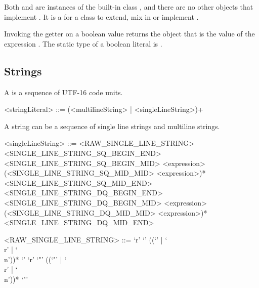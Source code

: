 \documentclass[makeidx]{article}
\begin{document}
{\LMHash{}%
Both  and  are instances of
the built-in class ,
and there are no other objects that implement .
It is a  for a class to
extend, mix in or implement .


\LMHash{}%
Invoking the getter  on a boolean value returns
the  object that is the value of the expression .
The static type of a boolean literal is .


\subsection{Strings}

\LMHash{}%
A  is a sequence of UTF-16 code units.


\begin{grammar}
<stringLiteral> ::= (<multilineString> | <singleLineString>)+
\end{grammar}

\LMHash{}%
A string can be a sequence of single line strings and multiline strings.

\begin{grammar}
<singleLineString> ::= <RAW\_SINGLE\_LINE\_STRING>
  \alt <SINGLE\_LINE\_STRING\_SQ\_BEGIN\_END>
  \alt <SINGLE\_LINE\_STRING\_SQ\_BEGIN\_MID> <expression> \gnewline{}
       (<SINGLE\_LINE\_STRING\_SQ\_MID\_MID> <expression>)* \gnewline{}
       <SINGLE\_LINE\_STRING\_SQ\_MID\_END>
  \alt <SINGLE\_LINE\_STRING\_DQ\_BEGIN\_END>
  \alt <SINGLE\_LINE\_STRING\_DQ\_BEGIN\_MID> <expression> \gnewline{}
       (<SINGLE\_LINE\_STRING\_DQ\_MID\_MID> <expression>)* \gnewline{}
       <SINGLE\_LINE\_STRING\_DQ\_MID\_END>

<RAW\_SINGLE\_LINE\_STRING> ::=
  `r' `\sq' (\gtilde(`\sq' | `\\r' | `\\n'))* `\sq'
  \alt `r' `"' (\gtilde(`"' | `\\r' | `\\n'))* `"'


\end{grammar}}
\end{document}
